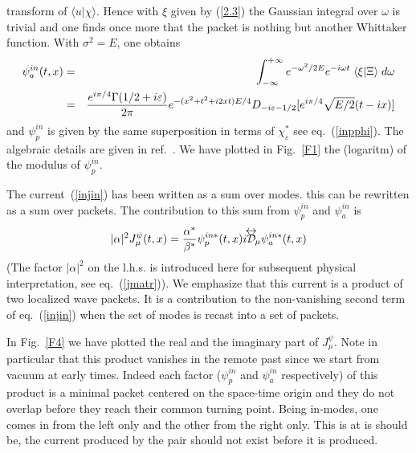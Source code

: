 \documentclass[12pt,oneside]{report}
\def\braket#1#2{\mathrel{\langle #1|#2\rangle}}
\def\lrD{{{\cal D}\kern-.9em\raise1.75ex\hbox{$\leftrightarrow$}}\!}
\begin{document}
transform of $\langle u|\chi \rangle$.  Hence with $\xi$ given
by (\ref{2.3}) the Gaussian integral over $\omega$ is trivial and one
finds once more that the packet is nothing but another Whittaker function.
With $\sigma^2 = E$, one obtains
\begin{eqnarray}
\psi_a^{in}(t,x)&=&\int_{-\infty}^{+\infty}e^{-\omega^2/2E}
e^{-i\omega t}\braket{\xi}{\Xi}d\omega \nonumber \\
&=&\frac{e^{i\pi /4}\Gamma(1/2+i\varepsilon)}{2\pi}
e^{-(x^2+t^2+i2xt)E/4}
D_{-i\varepsilon -1/2}[
e^{i\pi/4}\sqrt{E/2}(t-ix)]\mbox{\hfill}
 \nonumber \\
\label{gausswpkt}
\end{eqnarray}
and $\psi_p^{in}$ is given by the same superposition in terms of
$\chi^*_{\varepsilon}$ see eq.~(\ref{inpphi}).
The algebraic details are given in ref.~\cite{BMPPS}. 
We have plotted 
in Fig.~\ref{F1} the (logaritm) of the modulus  of $\psi_p^{in}$.
\par The current~(\ref{injin}) has been written as a sum over modes. this can
be rewritten as a sum over packets. The contribution to this sum from 
$\psi_p^{in}$ and $\psi_a^{in}$ is
\begin{equation} \vert \alpha \vert^2 J_{\mu}^{\psi}(t,x) = 
\frac{\alpha^*}{\beta^*} \psi_p^{in *}(t,x) i \lrD_{\mu} \psi_a^{in *}(t,x)
\label{jpsi}
\end{equation}
(The factor $\vert\alpha\vert^2$ on the l.h.s. is introduced here for
 subsequent physical interpretation, see eq.~(\ref{jmatr})). We emphasize that
this current is a product of two localized wave packets. It is a contribution to
the non-vanishing second term of eq.~(\ref{injin}) when the set of modes is
recast into a set of packets.

In Fig.~\ref{F4} we have plotted the real and the
imaginary part of $J_{\mu}^{\psi}$.
Note in particular that this product vanishes in the remote past
since we 
start from vacuum at early times.
Indeed each factor ($\psi_p^{in}$ and $\psi_a^{in}$ respectively) of 
this product
is a minimal packet centered
 on the space-time origin and they do not overlap before they 
reach their common
turning point.  Being in-modes, one comes
in from the left only and the other from the right only. 
This is at is should be,
the current produced by the pair should not exist before it is produced.
\end{document}
